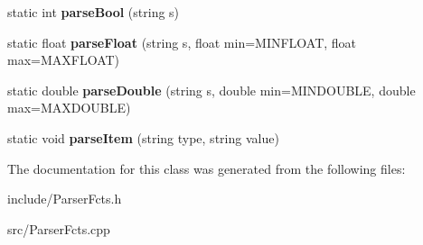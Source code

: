 \begin{DoxyCompactItemize}
\mbox{\label{classParserFcts_a06429b5b46b4ed9faf7c95cd6b8b768c}} 
static int {\bfseries parse\+Bool} (string s)
\item 
\mbox{\label{classParserFcts_ae29b56b515a3ed64872ce14e785e2058}} 
static float {\bfseries parse\+Float} (string s, float min=M\+I\+N\+F\+L\+O\+AT, float max=M\+A\+X\+F\+L\+O\+AT)
\item 
\mbox{\label{classParserFcts_a3b40a627089cb0073d322acc5cbc49a8}} 
static double {\bfseries parse\+Double} (string s, double min=M\+I\+N\+D\+O\+U\+B\+LE, double max=M\+A\+X\+D\+O\+U\+B\+LE)
\item 
\mbox{\label{classParserFcts_a00e09ec82e23e79da134142fc817150d}} 
static void {\bfseries parse\+Item} (string type, string value)
\end{DoxyCompactItemize}


The documentation for this class was generated from the following files\+:\begin{DoxyCompactItemize}
\item 
include/Parser\+Fcts.\+h\item 
src/Parser\+Fcts.\+cpp\end{DoxyCompactItemize}
